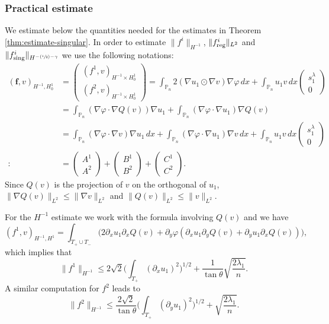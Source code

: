 \documentclass[JEP,XML,SOM,Unicode,ThmDefs,NoFloatCountersInSection,published]{cedram}
\newcommand{\Psfrac}[2]{(\sfrac{#1}{#2})}
\theoremstyle{plain}
\theoremstyle{definition}
\newcommand{\bo}[1]{{\boldsymbol#1}}
\newcommand{\reg}{\textup{reg}}
\newcommand{\sing}{\textup{sing}}
\def\Pp{{\mathbb{P}_n}}
\begin{document}
\subsubsection*{Practical estimate} We estimate below the quantities needed for the estimates in Theorem \ref{thm:estimate-singular}.
In order to estimate $\|f^i\|_{H^{-1}}$, $\|f^i_{\reg}\|_{L^2}$ and $\|f^i_{\sing}\|_{H^{-\Psfrac 12 -\gamma}}$ we use the following notations:
\begin{align*}
(\bo f,v)_{H^{-1},H_0^1}&=\begin{pmatrix} (f^1,v)_{H^{-1}\times H^1_0}\\ (f^2,v)_{H^{-1}\times H^1_0}\end{pmatrix} = \int_{\Pp} 2(\nabla u_1 \odot \nabla v)\nabla \varphi \, dx+ \int_{\Pp} u_1v\, dx \begin{pmatrix} s_1^\lambda\\ 0 \end{pmatrix} \\
&= \int_{\Pp} (\nabla \varphi \cdot \nabla Q(v))\nabla u_1 +\int_\Pp (\nabla \varphi \cdot \nabla u_1)\nabla Q(v)\\
&= \int_{\Pp} (\nabla \varphi \cdot \nabla v)\nabla u_1 \, dx+ \int_{\Pp} (\nabla \varphi \cdot \nabla u_1)\nabla v \, dx+\int_{\Pp} u_1v\, dx \begin{pmatrix} s_1^\lambda\\ 0 \end{pmatrix}\\
:\!&=\begin{pmatrix} A^1\\ A^2 \end{pmatrix}+\begin{pmatrix} B^1\\ B^2 \end{pmatrix}+\begin{pmatrix} C^1\\ C^2 \end{pmatrix}.
\end{align*}
Since $Q(v)$ is the projection of $v$ on the orthogonal of $u_1$, $\|\nabla Q(v)\|_{L^2} \leq \|\nabla v\|_{L^2}$ and $\|Q(v)\|_{L^2} \leq \|v\|_{L^2}$.

For the $H^{-1}$ estimate we work with the formula involving $Q(v)$ and we have
\[
(f^1,v)_{H^{-1},H^1} = \int_{T_+\cup T_-} \bigl(2\partial_x u_1 \partial_x Q(v) + \partial_y \varphi (\partial_x u_1 \partial_y Q(v) + \partial_y u_1 \partial_x Q(v))\bigr),
\]
which implies that
\[
\|f^1\|_{H^{-1}} \leq 2\sqrt{2} \biggl(\int_{T_+}(\partial_x u_1)^2\biggr)^{1/2}+\frac{1}{\tan \theta} \sqrt{\frac{2\lambda_1}{n}}.
\]
A similar computation for $f^2$ leads to
\[
\|f^2\|_{H^{-1}} \leq \frac{2\sqrt{2}}{\tan \theta}\biggl(\int_{T_+}(\partial_y u_1)^2\biggr)^{1/2} +\sqrt{\frac{2\lambda_1}{n}}.
\]
\end{document}
